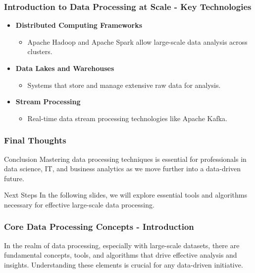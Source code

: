 \documentclass[aspectratio=169]{beamer}
\begin{document}
\begin{frame}[fragile]
    \frametitle{Introduction to Data Processing at Scale - Key Technologies}
    \begin{itemize}
        \item \textbf{Distributed Computing Frameworks}
            \begin{itemize}
                \item Apache Hadoop and Apache Spark allow large-scale data analysis across clusters.
            \end{itemize}
        
        \item \textbf{Data Lakes and Warehouses}
            \begin{itemize}
                \item Systems that store and manage extensive raw data for analysis.
            \end{itemize}
        
        \item \textbf{Stream Processing}
            \begin{itemize}
                \item Real-time data stream processing technologies like Apache Kafka.
            \end{itemize}
    \end{itemize}
\end{frame}

\begin{frame}[fragile]
    \frametitle{Final Thoughts}
    \begin{block}{Conclusion}
        Mastering data processing techniques is essential for professionals in data science, IT, and business analytics as we move further into a data-driven future.
    \end{block}
    
    \begin{block}{Next Steps}
        In the following slides, we will explore essential tools and algorithms necessary for effective large-scale data processing.
    \end{block}
\end{frame}

\begin{frame}[fragile]
    \frametitle{Core Data Processing Concepts - Introduction}
    In the realm of data processing, especially with large-scale datasets, there are fundamental concepts, tools, and algorithms that drive effective analysis and insights. Understanding these elements is crucial for any data-driven initiative.
\end{frame}
\end{document}
